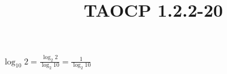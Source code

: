 \documentclass{article}
\title{TAOCP 1.2.2\mbox{-}20}
\begin{document}
\maketitle

\( \log_{10}{2} = \frac{\log_{2}{2}}{\log_{2}{10}} = \frac{1}{\log_{2}{10}} \)
\end{document}
